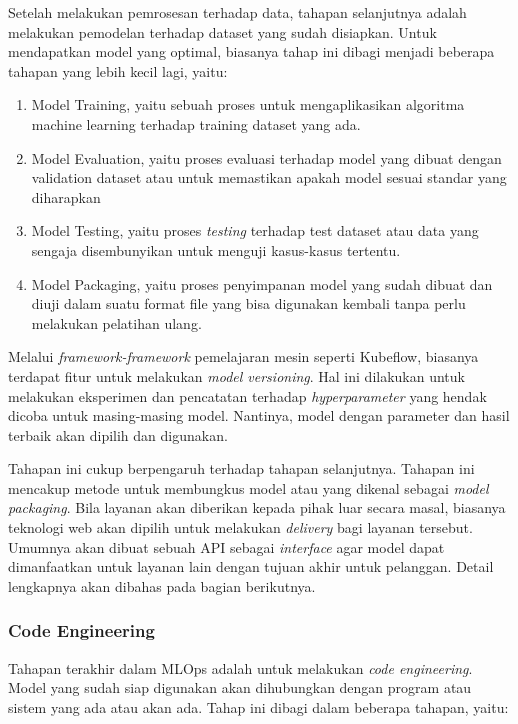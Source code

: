 Setelah melakukan pemrosesan terhadap data, tahapan selanjutnya adalah melakukan pemodelan terhadap dataset yang sudah disiapkan.
Untuk mendapatkan model yang optimal, biasanya tahap ini dibagi menjadi beberapa tahapan yang lebih kecil lagi, yaitu:
\begin{enumerate}
  \item Model Training, yaitu sebuah proses untuk mengaplikasikan algoritma machine learning terhadap training dataset yang ada.
  \item Model Evaluation, yaitu proses evaluasi terhadap model yang dibuat dengan validation dataset atau untuk memastikan apakah model sesuai standar yang diharapkan
  \item Model Testing, yaitu proses \textit{testing} terhadap test dataset atau data yang sengaja disembunyikan untuk menguji kasus-kasus tertentu.
  \item Model Packaging, yaitu proses penyimpanan model yang sudah dibuat dan diuji dalam suatu format file yang bisa digunakan kembali tanpa perlu melakukan pelatihan ulang.
\end{enumerate}

Melalui \textit{framework-framework} pemelajaran mesin seperti Kubeflow, biasanya terdapat fitur untuk melakukan \textit{model versioning}.
Hal ini dilakukan untuk melakukan eksperimen dan pencatatan terhadap \textit{hyperparameter} yang hendak dicoba untuk masing-masing model.
Nantinya, model dengan parameter dan hasil terbaik akan dipilih dan digunakan.

Tahapan ini cukup berpengaruh terhadap tahapan selanjutnya.
Tahapan ini mencakup metode untuk membungkus model atau yang dikenal sebagai \textit{model packaging}.
Bila layanan akan diberikan kepada pihak luar secara masal, biasanya teknologi web akan dipilih untuk melakukan \textit{delivery} bagi layanan tersebut.
Umumnya akan dibuat sebuah API sebagai \textit{interface} agar model dapat dimanfaatkan untuk layanan lain dengan tujuan akhir untuk pelanggan. Detail lengkapnya akan dibahas pada bagian berikutnya. 

\subsubsection{Code Engineering}

Tahapan terakhir dalam MLOps adalah untuk melakukan \textit{code engineering}.
Model yang sudah siap digunakan akan dihubungkan dengan program atau sistem yang ada atau akan ada.
Tahap ini dibagi dalam beberapa tahapan, yaitu:

